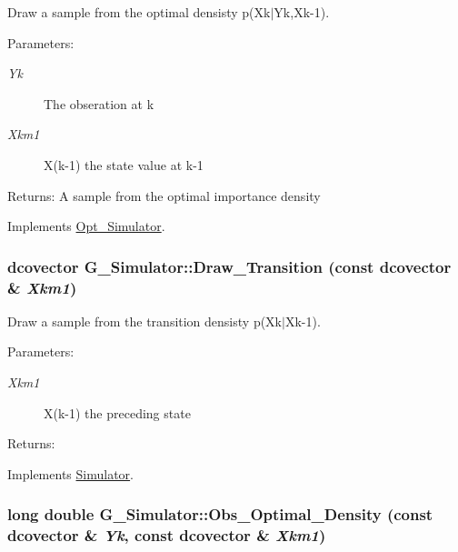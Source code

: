 Draw a sample from the optimal densisty p(Xk$|$Yk,Xk-1). 

\begin{Desc}
\item[Parameters:]
\begin{description}
\item[{\em Yk}]The obseration at k \item[{\em Xkm1}]X(k-1) the state value at k-1\end{description}
\end{Desc}
\begin{Desc}
\item[Returns:]A sample from the optimal importance density \end{Desc}


Implements \hyperlink{class_opt___simulator_75490247df4dfa14eb7b2d8d394675dd}{Opt\_\-Simulator}.\hypertarget{class_g___simulator_54563826e17b08d4cf66090731797888}{
\subsubsection[{Draw\_\-Transition}]{\setlength{\rightskip}{0pt plus 5cm}dcovector G\_\-Simulator::Draw\_\-Transition (const dcovector \& {\em Xkm1})}}
\label{class_g___simulator_54563826e17b08d4cf66090731797888}


Draw a sample from the transition densisty p(Xk$|$Xk-1). 

\begin{Desc}
\item[Parameters:]
\begin{description}
\item[{\em Xkm1}]X(k-1) the preceding state\end{description}
\end{Desc}
\begin{Desc}
\item[Returns:]\end{Desc}


Implements \hyperlink{class_simulator_45790421a1c2f597739d3e972ad28292}{Simulator}.\hypertarget{class_g___simulator_192df25d6edac87bf4aeb2d2f55d1c5c}{
\subsubsection[{Obs\_\-Optimal\_\-Density}]{\setlength{\rightskip}{0pt plus 5cm}long double G\_\-Simulator::Obs\_\-Optimal\_\-Density (const dcovector \& {\em Yk}, \/  const dcovector \& {\em Xkm1})}}
\label{class_g___simulator_192df25d6edac87bf4aeb2d2f55d1c5c}


